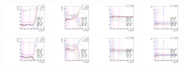 \begin{figure}[htbp]
  \centering
  \includegraphics[width=0.2\textwidth]{fig/analysis/paramSignalShape_allSig_MJJ_HP_bb_DEtaLo_mean.pdf}
  \includegraphics[width=0.2\textwidth]{fig/analysis/paramSignalShape_allSig_MJJ_HP_bb_DEtaLo_sigma.pdf}
  \includegraphics[width=0.2\textwidth]{fig/analysis/paramSignalShape_allSig_MJJ_HP_bb_DEtaLo_alpha.pdf}
  \includegraphics[width=0.2\textwidth]{fig/analysis/paramSignalShape_allSig_MJJ_HP_bb_DEtaLo_alpha2.pdf}\\
  \includegraphics[width=0.2\textwidth]{fig/analysis/paramSignalShape_allSig_MJJ_LP_bb_DEtaLo_mean.pdf}
  \includegraphics[width=0.2\textwidth]{fig/analysis/paramSignalShape_allSig_MJJ_LP_bb_DEtaLo_sigma.pdf}
  \includegraphics[width=0.2\textwidth]{fig/analysis/paramSignalShape_allSig_MJJ_LP_bb_DEtaLo_alpha.pdf}
  \includegraphics[width=0.2\textwidth]{fig/analysis/paramSignalShape_allSig_MJJ_LP_bb_DEtaLo_alpha2.pdf}\\

\end{figure}
